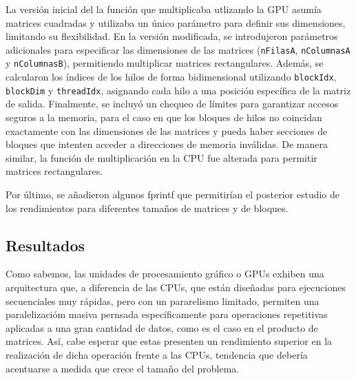 \documentclass[twocolumn,a4paper,12pt]{article}
\begin{document}
La versión inicial del la función que multiplicaba utlizando la GPU asumía matrices cuadradas y utilizaba un único parámetro para definir sus dimensiones, limitando su flexibilidad. En la versión modificada, se introdujeron parámetros adicionales para especificar las dimensiones de las matrices (\texttt{nFilasA}, \texttt{nColumnasA} y \texttt{nColumnasB}), permitiendo multiplicar matrices rectangulares. Además, se calcularon los índices de los hilos de forma bidimensional utilizando \texttt{blockIdx}, \texttt{blockDim} y \texttt{threadIdx}, asignando cada hilo a una posición específica de la matriz de salida. Finalmente, se incluyó un chequeo de límites para garantizar accesos seguros a la memoria, para el caso en que los bloques de hilos no coincidan exactamente con las dimensiones de las matrices y pueda haber secciones de bloques que intenten acceder a direcciones de memoria inválidas. De manera similar, la función de multiplicación en la CPU fue alterada para permitir matrices rectangulares.

Por último, se añadieron algunos fprintf que permitirían el posterior estudio de los rendimientos para diferentes tamaños de matrices y de bloques.

\subsection{Resultados}

Como sabemos, las unidades de procesamiento gráfico o GPUs exhiben una arquitectura que, a diferencia de las CPUs, que están diseñadas para ejecuciones secuenciales muy rápidas, pero con un pararelismo limitado, permiten una paralelizacióm masiva pernsada específicamente para operaciones repetitivas aplicadas a una gran cantidad de datos, como es el caso en el producto de matrices. Así, cabe esperar que estas presenten un rendimiento superior en la realización de dicha operación frente a las CPUs, tendencia que debería acentuarse a medida que crece el tamaño del problema.
\end{document}
